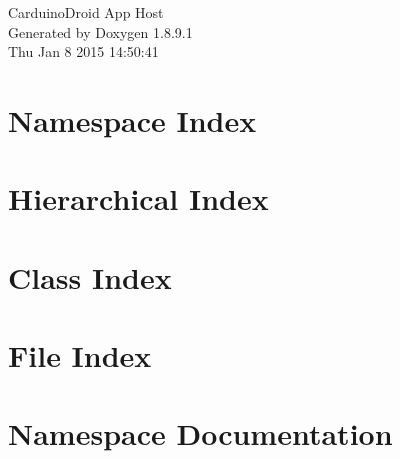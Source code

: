 \documentclass[twoside]{book}
\newcommand{\+}{\discretionary{\mbox{\scriptsize$\hookleftarrow$}}{}{}}
\newcommand{\clearemptydoublepage}{%
  \newpage{\pagestyle{empty}\cleardoublepage}%
}
\begin{document}
\hypersetup{pageanchor=false,
             bookmarks=true,
             bookmarksnumbered=true,
             pdfencoding=unicode
            }
\begin{titlepage}
\vspace*{7cm}
\begin{center}%
{\Large Carduino\+Droid App Host }\\
\vspace*{1cm}
{\large Generated by Doxygen 1.8.9.1}\\
\vspace*{0.5cm}
{\small Thu Jan 8 2015 14:50:41}\\
\end{center}
\end{titlepage}
\clearemptydoublepage
\tableofcontents
\clearemptydoublepage
{}
\hypersetup{pageanchor=true}

\chapter{Namespace Index}

\chapter{Hierarchical Index}

\chapter{Class Index}

\chapter{File Index}

\chapter{Namespace Documentation}





\end{document}
